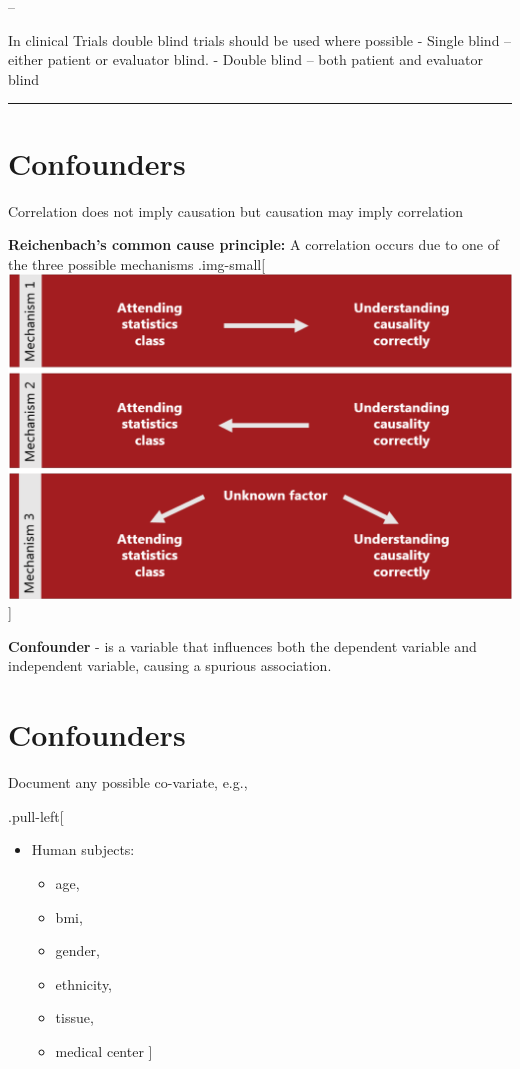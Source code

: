 \documentclass[]{article}
\providecommand{\tightlist}{%
  \setlength{\itemsep}{0pt}\setlength{\parskip}{0pt}}
\begin{document}
--

In clinical Trials double blind trials should be used where possible -
Single blind -- either patient or evaluator blind. - Double blind --
both patient and evaluator blind

\begin{center}\rule{0.5\linewidth}{\linethickness}\end{center}

\hypertarget{confounders}{%
\section{Confounders}\label{confounders}}

Correlation does not imply causation but causation may imply correlation

\textbf{Reichenbach's common cause principle:} A correlation occurs due
to one of the three possible mechanisms .img-small{[}
\includegraphics{../inst/images/Causality_Mechanisms_3.png}{]}

\textbf{Confounder} - is a variable that influences both the dependent
variable and independent variable, causing a spurious association.

\hypertarget{confounders-1}{%
\section{Confounders}\label{confounders-1}}

Document any possible co-variate, e.g.,

.pull-left{[}

\begin{itemize}
\tightlist
\item
  Human subjects:

  \begin{itemize}
  \tightlist
  \item
    age,
  \item
    bmi,
  \item
    gender,
  \item
    ethnicity,
  \item
    tissue,
  \item
    medical center {]}
  \end{itemize}
\end{itemize}
\end{document}
